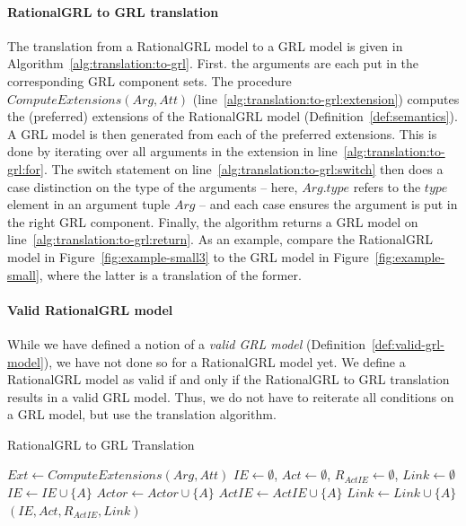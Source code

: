 \paragraph{RationalGRL to GRL translation} The translation from a RationalGRL model to a GRL model is given in Algorithm~\ref{alg:translation:to-grl}. First. the arguments are each put in the corresponding GRL component sets. The procedure $ComputeExtensions(Arg,Att)$ (line~\ref{alg:translation:to-grl:extension}) computes the (preferred) extensions of the RationalGRL model (Definition~\ref{def:semantics}). A GRL model is then generated from each of the preferred extensions. This is done by iterating over all arguments in the extension in line~\ref{alg:translation:to-grl:for}. The switch statement on line~\ref{alg:translation:to-grl:switch} then does a case distinction on the type of the arguments -- here, $Arg.type$ refers to the $type$ element in an argument tuple $Arg$ -- and each case ensures the argument is put in the right GRL component. Finally, the algorithm returns a GRL model on line~\ref{alg:translation:to-grl:return}. As an example, compare the RationalGRL model in Figure~\ref{fig:example-small3} to the GRL model in Figure~\ref{fig:example-small}, where the latter is a translation of the former.

\paragraph{Valid RationalGRL model} While we have defined a notion of a \emph{valid GRL model} (Definition~\ref{def:valid-grl-model}), we have not done so for a RationalGRL model yet. We define a RationalGRL model as valid if and only if the RationalGRL to GRL translation results in a valid GRL model. Thus, we do not have to reiterate all conditions on a GRL model, but use the translation algorithm.

\begin{algorithm}[b]
  \caption{RationalGRL to GRL Translation}
  \label{alg:translation:to-grl}
  \begin{algorithmic}[1]
    \State $Ext \leftarrow ComputeExtensions(Arg,Att)$\label{alg:translation:to-grl:extension}
    \State $IE\leftarrow\emptyset$, $Act\leftarrow\emptyset$, $R_{ActIE}\leftarrow\emptyset$, $Link\leftarrow \emptyset$
    \label{alg:translation:to-grl:for}
      \label{alg:translation:to-grl:switch}
            \State $IE\leftarrow IE\cup \{A\}$
          \EndCase
            \State $Actor\leftarrow Actor\cup \{A\}$
          \EndCase
            \State $ActIE\leftarrow ActIE\cup \{A\}$
          \EndCase
            \State $Link\leftarrow Link \cup\{A\}$
          \EndCase
      \EndSwitch
    \EndFor
    \State \Return $(IE,Act,R_{ActIE}, Link)$\label{alg:translation:to-grl:return}
    \EndFor
    \EndProcedure
  \end{algorithmic}
\end{algorithm}

